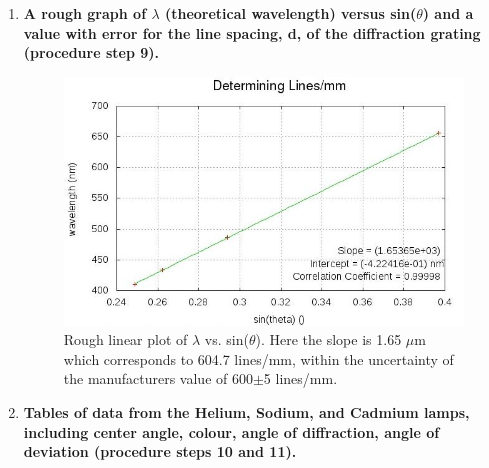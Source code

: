 \documentclass[justified]{tufte-book}
\begin{document}
\begin{enumerate}
\item {\bf A rough graph of $\lambda$ (theoretical wavelength) versus sin($\theta$) and a value with error for the line spacing, d, of the diffraction grating (procedure step 9).}\newline

\begin{figure}
\includegraphics{Spectroscopy-calibration.jpg}
\caption{Rough linear plot of $\lambda$ vs. sin($\theta$). Here the slope is 1.65 $\mu$m which corresponds to 604.7 lines/mm, within the uncertainty of the manufacturers value of 600$\pm$5 lines/mm.}
\label{fig:spcg1}
\end{figure}

\item {\bf Tables of data from the Helium, Sodium, and Cadmium lamps, including center angle, colour, angle of diffraction, angle of deviation (procedure steps 10 and 11).}\newline


\end{enumerate}
\end{document}
